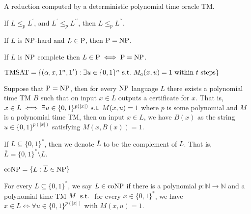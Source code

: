 \begin{note}
  A reduction computed by a deterministic polynomial time oracle TM.
\end{note}

\begin{note}[Transitivity]
  If $L \leq_p L^\prime$, and $L^\prime \leq_p L^{\prime \prime}$, then
  $L \leq_p L^{\prime \prime}$.
\end{note}

\begin{note}
  If $L$ is $\mathrm{NP}$-hard and $L \in \mathrm{P}$, then $\mathrm{P} = \mathrm{NP}$.
\end{note}

\begin{note}
  If $L$ is $\mathrm{NP}$ complete then $L \in \mathrm{P} \iff \mathrm{P} = \mathrm{NP}$.
\end{note}

\begin{note}[TMSAT]
  $\mathrm{TMSAT} = \{ (\alpha, x, 1^n, 1^t) :
    \text{$\exists u \in \{0, 1\}^n \mathrm{\ s.t.\ }
          M_a (x, u) = 1$ within $t$ steps} \}$
\end{note}

\begin{note}
  Suppose that $\mathrm{P} = \mathrm{NP}$, then for every $\mathrm{NP}$ language $L$ there exists
  a polynomial time TM $B$ such that on input $x \in L$ outputs a certificate
  for $x$.
  That is, $x \in L \iff \exists u \in \{ 0, 1\}^{p(|x|)} \mathrm{\ s.t.\ } M(x, u) = 1$
  where $p$ is some polynomial and $M$ is a polynomial time TM, then on
  input $x \in L$, we have $B(x)$ as the string $u \in \{0, 1\}^{p(|x|)}$
  satisfying $M(x, B(x)) = 1$.
\end{note}

\begin{note}
  If $L \subseteq \{0, 1\}^\ast$, then we denote $\overline{L}$ to be the
  complement of $L$.
  That is, $\overline{L} = \{0, 1\}^\ast \setminus L$.
\end{note}

\begin{note}[$\coNP$]
  $\mathrm{coNP} = \{L : \overline{L} \in \mathrm{NP}\}$
\end{note}

\begin{note}
  For every $L \subseteq \{0, 1\}^\ast$, we say $L \in \mathrm{coNP}$ if there
  is a polynomial $p : \mathbb{N} \to \mathbb{N}$ and a polynomial time
  TM $M$ $\mathrm{\ s.t.\ }$ for every $x \in \{0, 1\}^\ast$, we have
  $x \in L \iff \forall u \in \{0, 1\}^{p(|x|)}$ with $M(x, u) = 1$.
\end{note}

